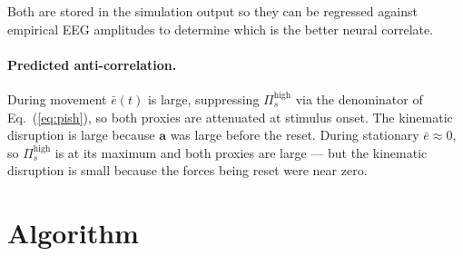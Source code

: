 \documentclass[11pt, a4paper]{article}
\newcommand{\vect}[1]{\bm{#1}}
\newcommand{\Pish}{\Pi_s^{\text{high}}}
\begin{document}
Both are stored in the simulation output so they can be regressed against
empirical EEG amplitudes to determine which is the better neural correlate.

\paragraph{Predicted anti-correlation.}
During movement $\bar{e}(t)$ is large, suppressing $\Pish$ via the
denominator of Eq.~(\ref{eq:pish}), so both proxies are attenuated at
stimulus onset. The kinematic disruption is large because $\vect{a}$ was large
before the reset. During stationary $\bar{e} \approx 0$, so $\Pish$ is at
its maximum and both proxies are large — but the kinematic disruption is small
because the forces being reset were near zero.

\section{Algorithm}
\end{document}
